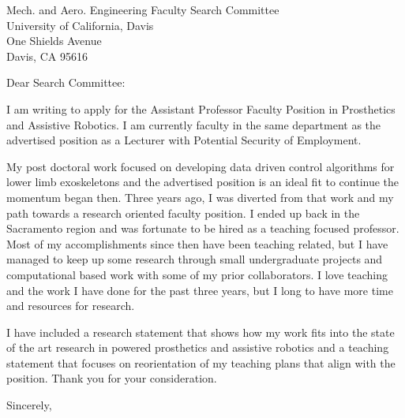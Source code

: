 \documentclass{letter}
\begin{document}
\begin{letter}{
    Mech. and Aero. Engineering Faculty Search Committee \\
    University of California, Davis \\
    One Shields Avenue \\
  Davis, CA 95616}
\opening{Dear Search Committee:}

I am writing to apply for the Assistant Professor Faculty Position in
Prosthetics and Assistive Robotics. I am currently faculty in the same
department as the advertised position as a Lecturer with Potential Security of
Employment.

My post doctoral work focused on developing data driven control algorithms for
lower limb exoskeletons and the advertised position is an ideal fit to continue
the momentum began then. Three years ago, I was diverted from that work and my
path towards a research oriented faculty position. I ended up back in the
Sacramento region and was fortunate to be hired as a teaching focused
professor. Most of my accomplishments since then have been teaching related,
but I have managed to keep up some research through small undergraduate
projects and computational based work with some of my prior collaborators. I
love teaching and the work I have done for the past three years, but I long to
have more time and resources for research.

I have included a research statement that shows how my work fits into the state
of the art research in powered prosthetics and assistive robotics and a
teaching statement that focuses on reorientation of my teaching plans that
align with the position. Thank you for your consideration.

\closing{Sincerely,}

\end{letter}
\end{document}
